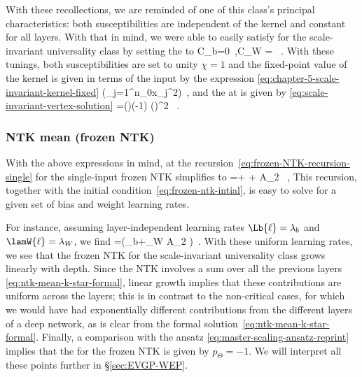 With these recollections, we are reminded of one of this class's principal characteristics: both susceptibilities are independent of the kernel and constant for all layers.
With that in mind, we were able to easily satisfy
 for the scale-invariant universality class 
by setting the  to 
\be\label{eq:scale-invariant-criticality-ntk-reprint}
C_b=0\, ,\qquad  C_W = \, .
\ee
With these tunings, both susceptibilities are set to unity $\chi=1$ and the fixed-point value of the kernel is given in terms of the input by the expression \eqref{eq:chapter-5-scale-invariant-kernel-fixed}
\be
\Tif{\ker}{} \equiv {} \le(\sum_{j=1}^{n_0}x_j^2\ri)\, ,
\ee
and the  at  is given by \eqref{eq:scale-invariant-vertex-solution}
\be\label{eq:scale-invariant-vertex-solution-reprint}
\Ti{\FPV}{}{\ell}=\le(\ri)\le(-1\ri) \le(\Tif{\ker}{}\ri)^2 \, .
\ee



\subsubsection{NTK mean (frozen NTK)}
With the above expressions in mind, at  the recursion~\eqref{eq:frozen-NTK-recursion-single} for the single-input frozen NTK simplifies to
\be\label{eq:frozen-NTK-recursion-single-scale-invariant}
=\Ti{\NTKI}{}{\ell}+ +  A_2  \Tif{\ker}{}\, ,
\ee
This recursion, together with the initial condition~\eqref{eq:frozen-ntk-intial}, is easy to solve for a given set of bias and weight learning rates. 

For instance, assuming layer-independent learning rates $\Lb{\ell}=\lambda_b$ and $\lamW{\ell}=\lambda_W$,
we find
\be\label{eq:frozen-ntk-critical-solution-relu}
\Ti{\NTKI}{}{\ell}=\le(\lambda_b+\lambda_W A_2 \Tif{\ker}{}\ri)\ell\, .
\ee
With these uniform learning rates, we see that the frozen NTK for the scale-invariant universality class grows linearly with depth. Since the NTK involves a sum over all the previous layers \eqref{eq:ntk-mean-k-star-formal}, linear growth implies that
these contributions are uniform across the layers;
this is in contrast to the non-critical cases, for which we would have had exponentially different contributions from the different layers of a deep network, as is clear from the formal solution~\eqref{eq:ntk-mean-k-star-formal}. 
Finally, a comparison with the ansatz \eqref{eq:master-scaling-ansatz-reprint} implies that the  for the frozen NTK is given by $p_\Theta  = -1$. We will interpret all these points further in \S\ref{sec:EVGP-WEP}.







